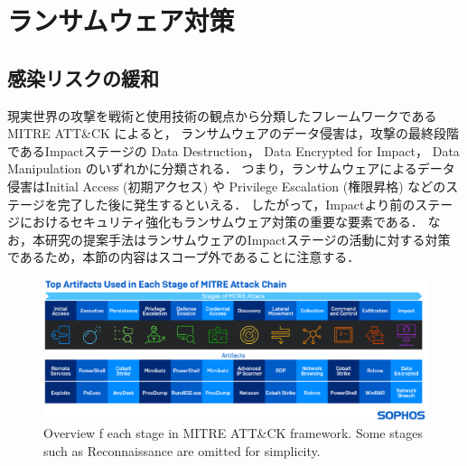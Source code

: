 \chapter{ランサムウェア対策}
\label{chap:ransomware-defense}
\section{感染リスクの緩和}
現実世界の攻撃を戦術と使用技術の観点から分類したフレームワークであるMITRE ATT\&CK \cite{MITREATT12:online}によると，
ランサムウェアのデータ侵害は，攻撃の最終段階であるImpactステージの
Data Destruction，
Data Encrypted for Impact，
Data Manipulation
のいずれかに分類される．
つまり，ランサムウェアによるデータ侵害はInitial Access (初期アクセス) や Privilege Escalation (権限昇格) などのステージを完了した後に発生するといえる．
したがって，Impactより前のステージにおけるセキュリティ強化もランサムウェア対策の重要な要素である．
なお，本研究の提案手法はランサムウェアのImpactステージの活動に対する対策であるため，本節の内容はスコープ外であることに注意する．
\begin{figure}[t]
  \begin{center}
    \includegraphics[width=\columnwidth]{doc/img/mitre-attack-chain.eps}
  \end{center}
  \caption{Overview f each stage in MITRE ATT\&CK framework.
    Some stages such as Reconnaissance are omitted for simplicity. \cite{mitre-explained}}
  \label{fig:mitre-attack-chain}
\end{figure}


